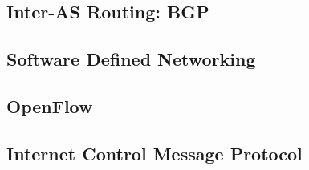 \subsection{Inter-AS Routing: BGP}

\newpage


\subsection{Software Defined Networking}

\subsection{OpenFlow}

\subsection{Internet Control Message Protocol}

